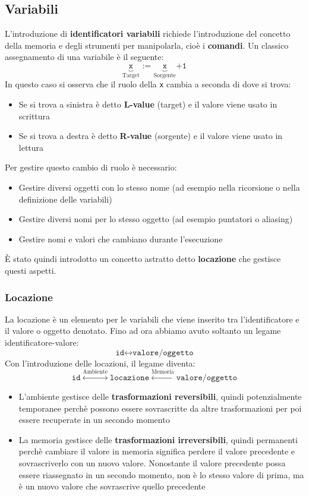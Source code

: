 \documentclass[a4paper]{article}
\begin{document}
\subsection{Variabili}
L'introduzione di \textbf{identificatori variabili} richiede l'introduzione del
concetto della memoria e degli strumenti per manipolarla, cioè i \textbf{comandi}.
Un classico assegnamento di una variabile è il seguente:
\[
  \underbrace{\texttt{x}}_{\text{Target}} \texttt{ := }
  \underbrace{\texttt{x}}_{\text{Sorgente}} \texttt{+1}
\] 
In questo caso si osserva che il ruolo della \texttt{x} cambia a seconda di dove
si trova:
\begin{itemize}
  \item Se si trova a sinistra è detto \textbf{L-value} (target) e il valore viene 
    usato in scrittura
  \item Se si trova a destra è detto \textbf{R-value} (sorgente) e il valore viene
    usato in lettura
\end{itemize}
Per gestire questo cambio di ruolo è necessario:
\begin{itemize}
  \item Gestire diversi oggetti con lo stesso nome (ad esempio nella ricorsione o nella
    definizione delle variabili)

  \item Gestire diversi nomi per lo stesso oggetto (ad esempio puntatori o aliasing)

  \item Gestire nomi e valori che cambiano durante l'esecuzione
\end{itemize}
È stato quindi introdotto un concetto astratto detto \textbf{locazione} che gestisce
questi aspetti.

\subsubsection{Locazione}
La locazione è un elemento per le variabili che viene inserito tra l'identificatore
e il valore o oggetto denotato. Fino ad ora abbiamo avuto soltanto un legame
identificatore-valore:
\[
  \texttt{id} \longleftrightarrow \texttt{valore/oggetto}
\] 
Con l'introduzione delle locazioni, il legame diventa:
\[
  \texttt{id} \stackrel{\text{Ambiente}}{\longleftrightarrow} \texttt{locazione}
  \stackrel{\text{Memoria}}{\longleftrightarrow} \texttt{valore/oggetto}
\] 
\begin{itemize}
  \item L'ambiente gestisce delle \textbf{trasformazioni reversibili}, quindi
    potenzialmente temporanee perchè possono essere sovrascritte da altre trasformazioni
    per poi essere recuperate in un secondo momento

  \item La memoria gestisce delle \textbf{trasformazioni irreversibili}, quindi
    permanenti perchè cambiare il valore in memoria significa perdere il valore precedente
    e sovrascriverlo con un nuovo valore. Nonostante il valore precedente possa essere
    riassegnato in un secondo momento, non è lo stesso valore di prima, ma è
    un nuovo valore che sovrascrive quello precedente
\end{itemize}
\end{document}

